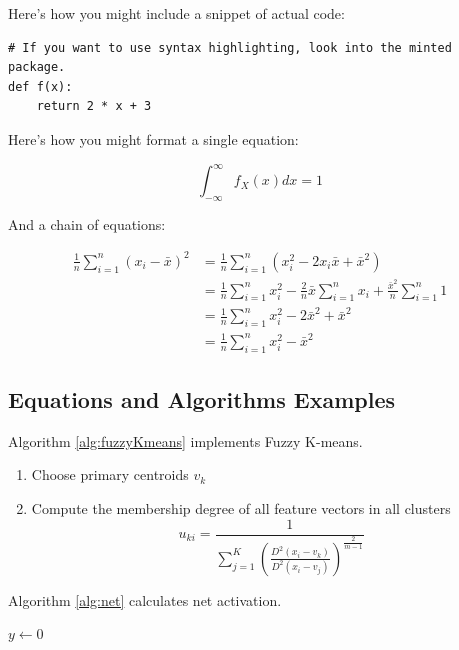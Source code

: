 \documentclass[12pt,letterpaper]{article}
\begin{document}
Here's how you might include a snippet of actual code:

\begin{verbatim}
# If you want to use syntax highlighting, look into the minted package.
def f(x):
    return 2 * x + 3
\end{verbatim}

Here's how you might format a single equation:

$$\int_{-\infty}^\infty f_X(x)dx = 1$$

And a chain of equations:

\begin{align*}
    \frac{1}{n}\sum_{i = 1}^n (x_i - \bar{x})^2 & = \frac{1}{n}\sum_{i = 1}^n (x_i^2 - 2x_i\bar{x} + \bar{x}^2)
    \\ &= \frac{1}{n}\sum_{i = 1}^n x_i^2 - \frac{2}{n}\bar{x}\sum_{i = 1}^n x_i + \frac{\bar{x}^2}{n}\sum_{i = 1}^n 1
    \\ &= \frac{1}{n}\sum_{i = 1}^n x_i^2 - 2\bar{x}^2 + \bar{x}^2
    \\ &= \frac{1}{n}\sum_{i = 1}^n x_i^2 - \bar{x}^2
\end{align*}


\subsection{Equations and Algorithms Examples}

Algorithm \ref{alg:fuzzyKmeans} implements Fuzzy K-means.

\begin{algorithm}
    \caption{Fuzzy K-means clustering algorithm}
    \label{alg:fuzzyKmeans}
    \begin{enumerate}
        \item Choose primary centroids $v_{k}$
        \item Compute the membership degree of all feature vectors in all clusters
              \begin{equation}
                  u_{ki}  = \frac{1}{ \sum_{j=1}^K ( \frac{D^{2}(x_{i} - v_{k})}{D^{2}(x_{i} - v_{j})})^\frac{2}
                      {m-1}}
                  \label{eq:kmeans}
              \end{equation}
    \end{enumerate}
\end{algorithm}

Algorithm \ref{alg:net} calculates net activation.


\begin{algorithm}
    \caption{Computing Net Activation}
    \label{alg:net}
    $y\leftarrow 0$\;
\end{algorithm}
\end{document}
